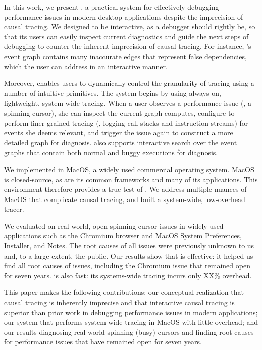 In this work, we present \xxx, a practical system for effectively debugging
performance issues in modern desktop applications despite the imprecision of
causal tracing.  We designed \xxx to be interactive, as a debugger should rightly be,
so that its users can easily inspect current diagnostics and guide the next
steps of debugging to counter the inherent imprecision of causal tracing. For
instance, \xxx's event graph contains many inaccurate
edges that represent false dependencies, which the user can address in an
interactive manner.

Moreover, \xxx enables users to dynamically control the granularity of
tracing using a number of intuitive primitives. The system begins by using
always-on, lightweight, system-wide tracing.  When a user observes a
performance issue (\eg, a spinning cursor), she can inspect the current
graph \xxx computes, configure \xxx to perform finer-grained tracing (\eg,
logging call stacks and instruction streams) for events she deems
relevant, and trigger the issue again to construct a more detailed graph for diagnosis.  \xxx also
supports interactive search over the event graphs that contain both normal
and buggy executions for diagnosis.

We implemented \xxx in MacOS, a widely used commercial operating system. MacOS
is closed-source, as are its common frameworks and many of its applications.
This environment therefore provides a true test of \xxx.  We address multiple
nuances of MacOS that complicate causal tracing, and built a system-wide,
low-overhead tracer.

We evaluated \xxx on \nbug real-world, open spinning-cursor issues in
widely used applications such as the Chromium browser and MacOS System
Preferences, Installer, and Notes.  The root causes of all \nbug issues
were previously unknown to us and, to a large extent, the public. Our
results show that \xxx is effective: it helped us find all root causes of
issues, including the Chromium issue that remained open for seven years.
\xxx is also fast: its systems-wide tracing incurs only XX\% overhead.

This paper makes the following contributions: our conceptual realization
that causal tracing is inherently imprecise and that interactive causal
tracing is superior than prior work in debugging performance issues in
modern applications; our system \xxx that performs system-wide tracing in
MacOS with little overhead; and our results diagnosing real-world spinning (busy)
cursors and finding root causes for performance issues that have remained open
for seven years.

